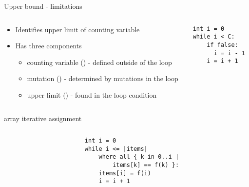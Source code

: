 \begin{frame}[fragile]{Upper bound - limitations}

\begin{columns}

\begin{column}{0.5\textwidth}
\begin{itemize}
\item Identifies upper limit of counting variable
\item Has three components
\begin{itemize}
    \item counting variable () - defined outside of the loop 
    \item mutation (\code{<=}) - determined by mutations in the loop
    \item upper limit () - found in the loop condition
\end{itemize}
\end{itemize}
\end{column}

\begin{column}{0.5\textwidth}
\begin{verbatim}
int i = 0
while i < C:
    if false:
      i = i - 1
    i = i + 1
\end{verbatim}
\end{column}

\end{columns}
\end{frame}



\begin{frame}[fragile]{array iterative assignment}

\begin{columns}

\begin{column}{0.5\textwidth}
\end{column}

\begin{column}{0.5\textwidth}
\begin{verbatim}
int i = 0
while i <= |items|
    where all { k in 0..i |
        items[k] == f(k) }:
    items[i] = f(i)
    i = i + 1
\end{verbatim}
\end{column}

\end{columns}

\end{frame}

